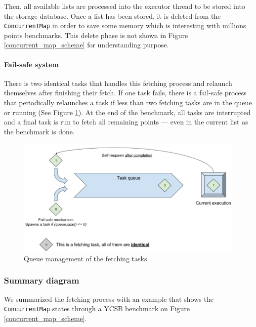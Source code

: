 \documentclass[a4paper,11pt]{report}
\begin{document}
Then, all available lists are processed into the executor thread to be stored into the storage database. Once a list has been stored, it is deleted from the \texttt{ConcurrentMap} in order to save some memory which is interesting with millions points benchmarks. This delete phase is not shown in Figure \ref{concurrent_map_scheme} for understanding purpose.


\paragraph{Fail-safe system}

There is two identical tasks that handles this fetching process and relaunch themselves after finishing their fetch. If one task fails, there is a fail-safe process that periodically relaunches a task if less than two fetching tasks are in the queue or running (See Figure \ref{queue_management_report}). At the end of the benchmark, all tasks are interrupted and a final task is run to fetch all remaining points --- even in the current list as the benchmark is done.

\begin{figure}[ht]
\begin{center}
\includegraphics[width=1\linewidth]{images/queue_management_report.png}
\caption{Queue management of the fetching tasks.}
\label{queue_management_report}
\end{center}
\end{figure}

\clearpage
\subsubsection{Summary diagram}

We summarized the fetching process with an example that shows the \texttt{ConcurrentMap} states through a YCSB benchmark on Figure \ref{concurrent_map_scheme}.
\end{document}
